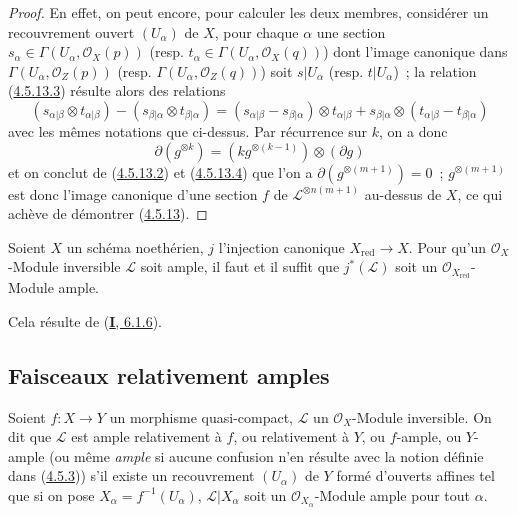 \begin{proof}
En effet, on peut encore, pour calculer les deux membres, considérer un
recouvrement ouvert $(U_\alpha)$ de $X$, pour chaque $\alpha$ une section
$s_\alpha\in\Gamma(U_\alpha,\mathcal{O}_X(p))$ (resp.
$t_\alpha\in\Gamma(U_\alpha,\mathcal{O}_X(q))$) dont l'image canonique dans
$\Gamma(U_\alpha,\mathcal{O}_Z(p))$ (resp.
$\Gamma(U_\alpha,\mathcal{O}_Z(q))$) soit $s|U_\alpha$ (resp.
$t|U_\alpha$)~; la relation
(\hyperref[II.4.5.13.3-fr]{4.5.13.3}) résulte alors des relations
\[
  (s_{\alpha|\beta}\otimes t_{\alpha|\beta})
  -(s_{\beta|\alpha}\otimes t_{\beta|\alpha})
  =(s_{\alpha|\beta}-s_{\beta|\alpha})\otimes t_{\alpha|\beta}
  +s_{\beta|\alpha}\otimes(t_{\alpha|\beta}-t_{\beta|\alpha})
\]
avec les mêmes notations que ci-dessus. Par récurrence sur $k$, on a donc
\begin{equation}
\label{II.4.5.13.4-fr}
  \partial(g^{\otimes k})=(kg^{\otimes(k-1)})\otimes(\partial g)
\tag{4.5.13.4}
\end{equation}
et on conclut de (\hyperref[II.4.5.13.2-fr]{4.5.13.2}) et
(\hyperref[II.4.5.13.4-fr]{4.5.13.4}) que l'on a
$\partial(g^{\otimes(m+1)})=0$~; $g^{\otimes(m+1)}$ est donc l'image
canonique d'une section $f$ de $\mathcal{L}^{\otimes n(m+1)}$ au-dessus de
$X$, ce qui achève de démontrer (\hyperref[II.4.5.13-fr]{4.5.13}).
\end{proof}

\begin{corollary}[4.5.14]
\label{II.4.5.14-fr}
Soient $X$ un schéma noethérien, $j$ l'injection canonique
$X_{\mathrm{red}}\to X$. Pour qu'un $\mathcal{O}_X$-Module inversible
$\mathcal{L}$ soit ample, il faut et il suffit que $j^*(\mathcal{L})$ soit
un $\mathcal{O}_{X_{\mathrm{red}}}$-Module ample.
\end{corollary}

Cela résulte de (\hyperref[I.6.1.6-fr]{\textbf{I}, 6.1.6}).

\subsection{Faisceaux relativement amples}
\label{II.4.6-fr}

\begin{definition}[4.6.1]
\label{II.4.6.1-fr}
Soient $f:X\to Y$ un morphisme quasi-compact, $\mathcal{L}$ un
$\mathcal{O}_X$-Module inversible. On dit que $\mathcal{L}$ est ample
relativement à $f$, ou relativement à $Y$, ou $f$-ample, ou $Y$-ample \textup{(ou
même \emph{ample} si aucune confusion n'en résulte avec la notion définie dans
(\hyperref[II.4.5.3-fr]{4.5.3}))} s'il existe un recouvrement $(U_\alpha)$
de $Y$ formé d'ouverts affines tel que si on pose
$X_\alpha=f^{-1}(U_\alpha)$, $\mathcal{L}|X_\alpha$ soit un
$\mathcal{O}_{X_\alpha}$-Module ample pour tout $\alpha$.
\end{definition}

